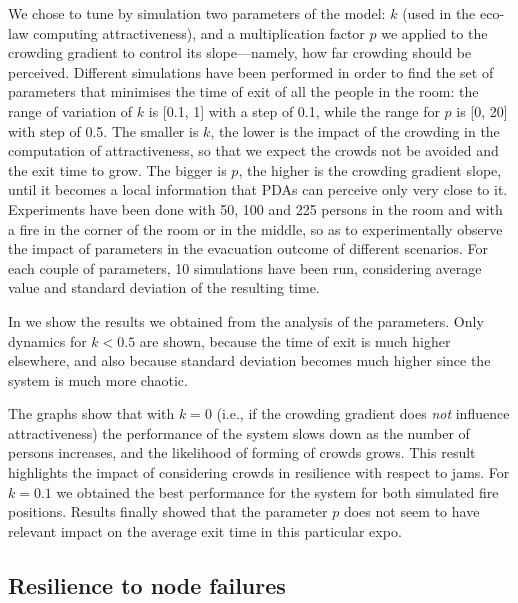 \documentclass[12pt,a4paper,twoside,openright]{book}
\begin{document}
We chose to tune by simulation two parameters of the model: $k$ (used in the eco-law computing attractiveness), and a multiplication factor $p$ we applied to the crowding gradient to control its slope---namely, how far crowding should be perceived.
%
Different simulations have been performed in order to find the set of parameters that minimises the time of exit of all the people in the room: the range of variation of $k$ is [0.1, 1] with a step of 0.1, while the range for $p$ is [0, 20] with step of 0.5. 
%
The smaller is $k$, the lower is the impact of the crowding in the computation of attractiveness, so that we expect the crowds not be avoided and the exit time to grow.
%
The bigger is $p$, the higher is the crowding gradient slope, until it becomes a local information that PDAs can perceive only very close to it. 
%
Experiments have been done with 50, 100 and 225 persons in the room and with a fire in the corner of the room or in the middle, so as to experimentally observe the impact of parameters in the evacuation outcome of different scenarios.
%
For each couple of parameters, 10 simulations have been run, considering average value and standard deviation of the resulting time.

In  we show the results we obtained from the analysis of the parameters. 
%
Only dynamics for $k<0.5$ are shown, because the time of exit is much higher elsewhere, and also because standard deviation becomes much higher since the system is much more chaotic.

The graphs show that with $k=0$ (i.e., if the crowding gradient does \emph{not} influence attractiveness) the performance of the system slows down as the number of persons increases, and the likelihood of forming of crowds grows. This result highlights the impact of considering crowds in resilience with respect to jams.
%
For $k = 0.1$ we obtained the best performance for the system for both  simulated fire positions. Results finally showed that the parameter $p$ does not seem to have relevant impact on the average exit time in this particular expo.

\subsection{Resilience to node failures}
\end{document}
